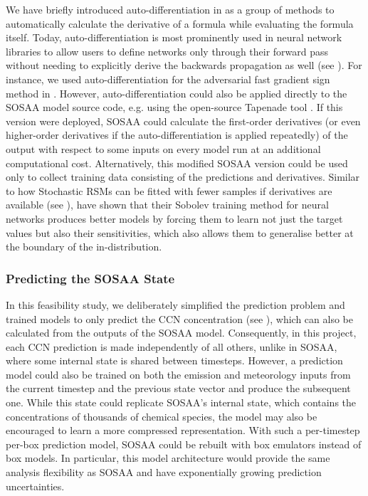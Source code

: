We have briefly introduced auto-differentiation in  as a group of methods to automatically calculate the derivative of a formula while evaluating the formula itself. Today, auto-differentiation is most prominently used in neural network libraries to allow users to define networks only through their forward pass without needing to explicitly derive the backwards propagation as well (see ). For instance, we used auto-differentiation for the adversarial fast gradient sign method in . However, auto-differentiation could also be applied directly to the SOSAA model source code, e.g. using the open-source Tapenade tool \cite{tapenade-autodiff-2013}. If this version were deployed, SOSAA could calculate the first-order derivatives (or even higher-order derivatives if the auto-differentiation is applied repeatedly) of the output with respect to some inputs on every model run at an additional computational cost. Alternatively, this modified SOSAA version could be used only to collect training data consisting of the predictions and derivatives. Similar to how Stochastic RSMs can be fitted with fewer samples if derivatives are available (see ), \textcite{sobolev-training-2017} have shown that their Sobolev training method for neural networks produces better models by forcing them to learn not just the target values but also their sensitivities, which also allows them to generalise better at the boundary of the in-distribution.

\subsubsection{Predicting the SOSAA State}

In this feasibility study, we deliberately simplified the prediction problem and trained models to only predict the CCN concentration (see ), which can also be calculated from the outputs of the SOSAA model. Consequently, in this project, each CCN prediction is made independently of all others, unlike in SOSAA, where some internal state is shared between timesteps. However, a prediction model could also be trained on both the emission and meteorology inputs from the current timestep and the previous state vector and produce the subsequent one. While this state could replicate SOSAA's internal state, which contains the concentrations of thousands of chemical species, the model may also be encouraged to learn a more compressed representation. With such a per-timestep per-box prediction model, SOSAA could be rebuilt with box emulators instead of box models. In particular, this model architecture would provide the same analysis flexibility as SOSAA and have exponentially growing prediction uncertainties.


